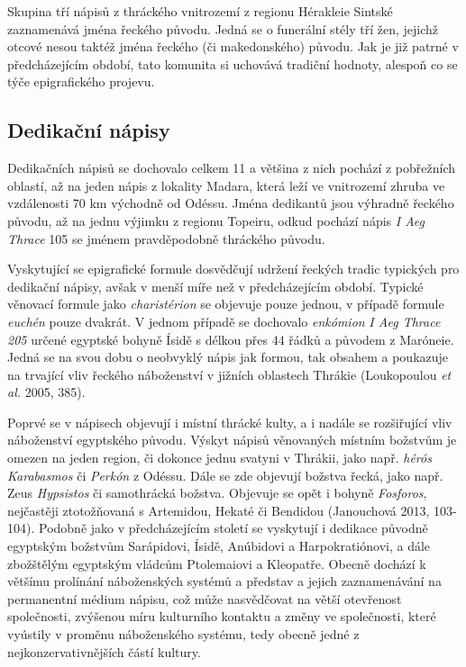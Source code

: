 Skupina tří nápisů z thráckého vnitrozemí z regionu Hérakleie Sintské zaznamenává jména řeckého původu. Jedná se o funerální stély tří žen, jejichž otcové nesou taktéž jména řeckého (či makedonského) původu. Jak je již patrné v předcházejícím období, tato komunita si uchovává tradiční hodnoty, alespoň co se týče epigrafického projevu.

\subsection[dedikační-nápisy-8]{Dedikační nápisy}

Dedikačních nápisů se dochovalo celkem 11 a většina z nich pochází z pobřežních oblastí, až na jeden nápis z lokality Madara, která leží ve vnitrozemí zhruba ve vzdálenosti 70 km východně od Odéssu. Jména dedikantů jsou výhradně řeckého původu, až na jednu výjimku z regionu Topeiru, odkud pochází nápis {\em I Aeg Thrace} 105 se jménem pravděpodobně thráckého původu.

Vyskytující se epigrafické formule dosvědčují udržení řeckých tradic typických pro dedikační nápisy, avšak v menší míře než v předcházejícím období. Typické věnovací formule jako {\em charistérion} se objevuje pouze jednou, v případě formule {\em euchén} pouze dvakrát. V jednom případě se dochovalo {\em enkómion} {\em I Aeg Thrace 205} určené egyptské bohyně Ísidě s délkou přes 44 řádků a původem z Maróneie. Jedná se na svou dobu o neobvyklý nápis jak formou, tak obsahem a poukazuje na trvající vliv řeckého náboženství v jižních oblastech Thrákie (Loukopoulou {\em et al.} 2005, 385).

Poprvé se v nápisech objevují i místní thrácké kulty, a i nadále se rozšiřující vliv náboženství egyptského původu. Výskyt nápisů věnovaných místním božstvům je omezen na jeden region, či dokonce jednu svatyni v Thrákii, jako např. {\em hérós} {\em Karabasmos} či {\em Perkón} z Odéssu. Dále se zde objevují božstva řecká, jako např. Zeus {\em Hypsistos} či samothrácká božstva. Objevuje se opět i bohyně {\em Fosforos}, nejčastěji ztotožňovaná s Artemidou, Hekaté či Bendidou (Janouchová 2013, 103-104). Podobně jako v předcházejícím století se vyskytují i dedikace původně egyptským božstvům Sarápidovi, Ísidě, Anúbidovi a Harpokratiónovi, a dále zbožštělým egyptským vládcům Ptolemaiovi a Kleopatře. Obecně dochází k většímu prolínání náboženských systémů a představ a jejich zaznamenávání na permanentní médium nápisu, což může nasvědčovat na větší otevřenost společnosti, zvýšenou míru kulturního kontaktu a změny ve společnosti, které vyústily v proměnu náboženského systému, tedy obecně jedné z nejkonzervativnějších částí kultury.

